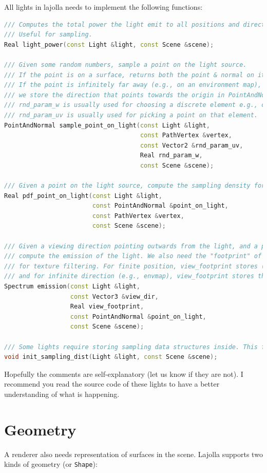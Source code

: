 All lights in lajolla needs to implement the following functions:
\begin{lstlisting}[language=c++]
/// Computes the total power the light emit to all positions and directions.
/// Useful for sampling.
Real light_power(const Light &light, const Scene &scene);

/// Given some random numbers, sample a point on the light source.
/// If the point is on a surface, returns both the point & normal on it.
/// If the point is infinitely far away (e.g., on an environment map),
/// we store the direction that points towards the origin in PointAndNormal.normal.
/// rnd_param_w is usually used for choosing a discrete element e.g., choosing a triangle in a mesh light.
/// rnd_param_uv is usually used for picking a point on that element.
PointAndNormal sample_point_on_light(const Light &light, 
                                     const PathVertex &vertex,
                                     const Vector2 &rnd_param_uv,
                                     Real rnd_param_w,
                                     const Scene &scene);

/// Given a point on the light source, compute the sampling density for the function above.
Real pdf_point_on_light(const Light &light,
                        const PointAndNormal &point_on_light,
                        const PathVertex &vertex,
                        const Scene &scene);

/// Given a viewing direction pointing outwards from the light, and a point on the light,
/// compute the emission of the light. We also need the "footprint" of the ray
/// for texture filtering. For finite position, view_footprint stores (approximatedly) du/dx
/// and for infinite direction (e.g., envmap), view_footprint stores the approximated ddir/dx.
Spectrum emission(const Light &light,
                  const Vector3 &view_dir,
                  Real view_footprint,
                  const PointAndNormal &point_on_light,
                  const Scene &scene);

/// Some lights require storing sampling data structures inside. This function initialize them.
void init_sampling_dist(Light &light, const Scene &scene);
\end{lstlisting}

Hopefully the comments are self-explanatory (let us know if they are not). I recommend you read the source code of these lights to have a better understanding of what is happening.

\section{Geometry}
A renderer also needs representation of surfaces in the scene. Lajolla supports two kinds of geometry (or \lstinline{Shape}):


